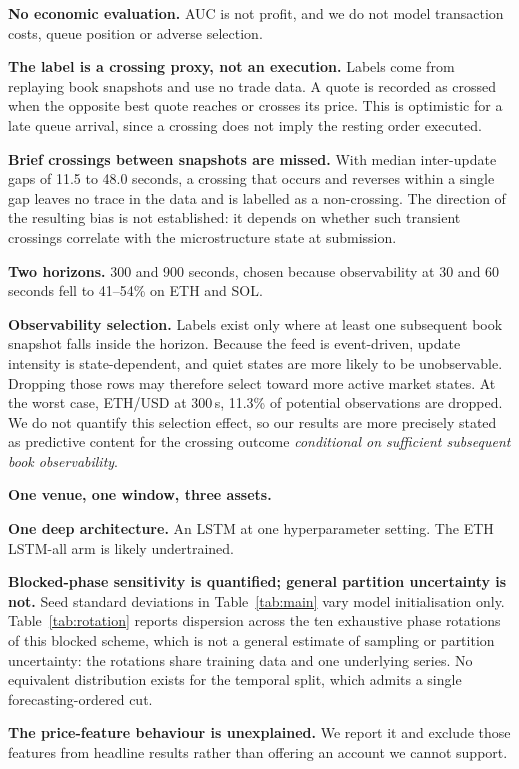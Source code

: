 \documentclass[11pt]{article}
\begin{document}
\textbf{No economic evaluation.} AUC is not profit, and we do not model
transaction costs, queue position or adverse selection.

\textbf{The label is a crossing proxy, not an execution.} Labels come from
replaying book snapshots and use no trade data. A quote is recorded as crossed
when the opposite best quote reaches or crosses its price. This is optimistic for a
late queue arrival, since a crossing does not imply the resting order executed.

\textbf{Brief crossings between snapshots are missed.} With median inter-update
gaps of 11.5 to 48.0 seconds, a crossing that occurs and reverses within a
single gap leaves no trace in the data and is labelled as a non-crossing. The
direction of the resulting bias is not established: it depends on whether such
transient crossings correlate with the microstructure state at submission.

\textbf{Two horizons.} 300 and 900 seconds, chosen because observability at 30
and 60 seconds fell to 41--54\% on ETH and SOL.

\textbf{Observability selection.} Labels exist only where at least one
subsequent book snapshot falls inside the horizon. Because the feed is
event-driven, update intensity is state-dependent, and quiet states are more
likely to be unobservable. Dropping those rows may therefore select toward more
active market states. At the worst case, ETH/USD at 300\,s, 11.3\% of potential
observations are dropped. We do not quantify this selection effect, so our
results are more precisely stated as predictive content for the crossing
outcome \emph{conditional on sufficient subsequent book observability}.

\textbf{One venue, one window, three assets.}

\textbf{One deep architecture.} An LSTM at one hyperparameter setting. The ETH
LSTM-all arm is likely undertrained.

\textbf{Blocked-phase sensitivity is quantified; general partition uncertainty
is not.} Seed standard deviations in Table~\ref{tab:main} vary model
initialisation only. Table~\ref{tab:rotation} reports dispersion across the ten
exhaustive phase rotations of this blocked scheme, which is not a general
estimate of sampling or partition uncertainty: the rotations share training
data and one underlying series. No equivalent distribution exists for the
temporal split, which admits a single forecasting-ordered cut.

\textbf{The price-feature behaviour is unexplained.} We report it and exclude
those features from headline results rather than offering an account we cannot
support.
\end{document}
